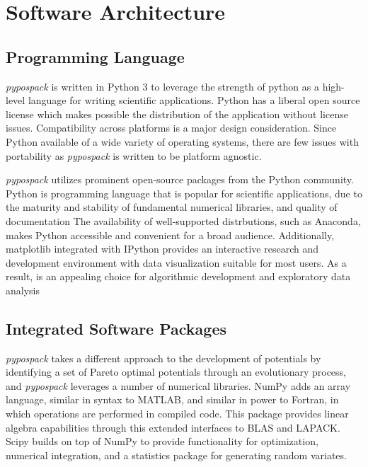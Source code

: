 \section{Software Architecture}
\label{sec:software_architecture}

\subsection{Programming Language}
\emph{pypospack} is written in Python 3 to leverage the strength of python as a high-level language for writing scientific applications.  Python has a liberal open source license which makes possible the distribution of the application without license issues. Compatibility across platforms is a major design consideration.  Since Python available of a wide variety of operating systems, there are few issues with portability as \emph{pypospack} is written to be platform agnostic.

\emph{pypospack} utilizes prominent open-source packages from the Python community.  Python is programming language that is popular for scientific applications, due to the maturity and stability of fundamental numerical libraries, and quality of documentation  The availability of well-supported distrbutions, such as Anaconda\cite{python_anaconda}, makes Python accessible and convenient for a broad audience.  Additionally, matplotlib\cite{hunter2007_matplotlib} integrated with IPython\cite{} provides an interactive research and development environment with data visualization suitable for most users.  As a result, is an appealing choice for algorithmic development and exploratory data analysis\cite{dubois2007_python}

\subsection{Integrated Software Packages}

\emph{pypospack} takes a different approach to the development of potentials by identifying a set of Pareto optimal potentials through an evolutionary process, and \emph{pypospack} leverages a number of numerical libraries.  NumPy\cite{walt2011_numpy} adds an array language, similar in syntax to MATLAB, and similar in power to Fortran, in which operations are performed in compiled code.  This package provides linear algebra capabilities through this extended interfaces to BLAS\cite{blas2002} and LAPACK\cite{anderson1990_lapack}.  Scipy\cite{jones_scipy} builds on top of NumPy to provide functionality for optimization, numerical integration, and a statistics package for generating random variates.

